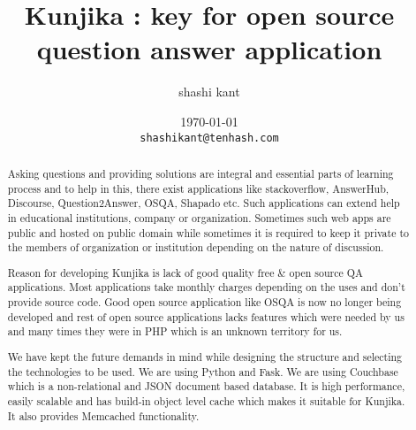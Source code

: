 \documentclass[a4paper,10pt]{report}
\title{Kunjika : key for open source question answer application}
\author{shashi kant}
\date{\today \\ \texttt{shashikant@tenhash.com}}
\begin{document}
\maketitle
\begin{abstract}
Asking questions and providing solutions are integral and essential parts of learning process and to help in this, there exist applications like stackoverflow, AnswerHub, Discourse, Question2Answer, OSQA, Shapado etc. Such applications can extend help in educational institutions, company or organization. Sometimes such web apps are public and hosted on public domain while sometimes it is required to keep it private to the members of organization or institution depending on the nature of discussion.

Reason for developing Kunjika is lack of good quality free \& open source QA applications. Most applications take monthly charges depending on the uses and don't provide source code. Good open source application like OSQA is now no longer being developed and rest of open source applications lacks features which were needed by us and many times they were in PHP which is an unknown territory for us.

We have kept the future demands in mind while designing the structure and selecting the technologies to be used. We are  using Python and Fask.  We are using Couchbase which is a non-relational and JSON document based database. It is high performance, easily scalable and has build-in object level cache which makes it suitable for Kunjika. It also provides Memcached functionality.
\end{abstract}
\end{document}
